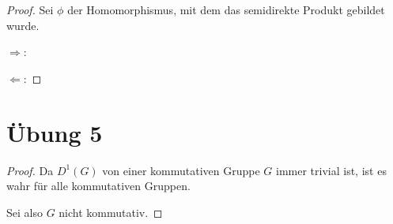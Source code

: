 \documentclass[10pt,a4paper]{article}
\begin{document}
\begin{proof}
  Sei $\phi$ der Homomorphismus, mit dem das semidirekte Produkt gebildet wurde.

  $\Rightarrow$:

  $\Leftarrow$:
\end{proof}

\section{Übung 5}

\begin{proof}
  Da $D^{1}(G)$ von einer kommutativen Gruppe $G$ immer trivial ist, ist es wahr für alle kommutativen Gruppen.

  Sei also $G$ nicht kommutativ.
\end{proof}
\end{document}
